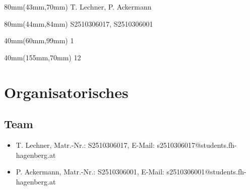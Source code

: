 

\newcommand{\docproject}{Bilderverwaltung}			%
\newcommand{\docsubject}{Software Design Patterns}	%
\newcommand{\docsubjectshort}{SDP3}					%
\newcommand{\docexercise}{Übung 4}					%
\newcommand{\docauthor}{T. Lechner}					%
\newcommand{\doccoauthor}{P. Ackermann}				%
\newcommand{\docauthornumber}{S2510306017}			%
\newcommand{\doccoauthornumber}{S2510306001}		%
\newcommand{\docauthoremail}{s2510306017@students.fh-hagenberg.at}
\newcommand{\doccoauthoremail}{s2510306001@students.fh-hagenberg.at}
\newcommand{\docdate}{\date}						%
\newcommand{\docsemester}{Wintersemester 2026/2027}	%




\begin{textblock*}{80mm}(43mm,70mm)
	\docauthor, \doccoauthor
\end{textblock*}
\begin{textblock*}{80mm}(44mm,84mm)
	\docauthornumber, \doccoauthornumber
\end{textblock*}
\begin{textblock*}{40mm}(60mm,99mm)
	1 					%
\end{textblock*}
\begin{textblock*}{40mm}(155mm,70mm)
	12					%
\end{textblock*}


\newpage
\hgbtitle
\newpage



\tableofcontents
\newpage


\section{Organisatorisches}

\subsection{Team}
\begin{itemize}
	\item \docauthor, Matr.-Nr.: \docauthornumber, E-Mail: \docauthoremail	
	\item \doccoauthor, Matr.-Nr.: \doccoauthornumber, E-Mail: \doccoauthoremail
\end{itemize}

